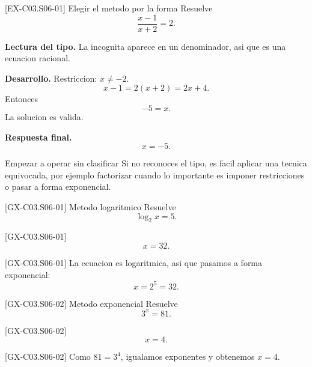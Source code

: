 \begin{solvedexample}{[EX-C03.S06-01] Elegir el metodo por la forma}
Resuelve
\[
\frac{x-1}{x+2}=2.
\]

\textbf{Lectura del tipo.} La incognita aparece en un denominador, asi que es una ecuacion
racional.

\textbf{Desarrollo.} Restriccion: \(x\neq -2\).
\[
x-1=2(x+2)=2x+4.
\]
Entonces
\[
-5=x.
\]
La solucion es valida.

\textbf{Respuesta final.}
\[
x=-5.
\]
\end{solvedexample}

\begin{commonerror}{Empezar a operar sin clasificar}
Si no reconoces el tipo, es facil aplicar una tecnica equivocada, por ejemplo factorizar cuando
lo importante es imponer restricciones o pasar a forma exponencial.
\end{commonerror}

\begin{guidedexercise}{[GX-C03.S06-01] Metodo logaritmico}
Resuelve
\[
\log_2 x=5.
\]
\end{guidedexercise}

\begin{shortanswer}{[GX-C03.S06-01]}
\[
x=32.
\]
\end{shortanswer}

\begin{fullsolution}{[GX-C03.S06-01]}
La ecuacion es logaritmica, asi que pasamos a forma exponencial:
\[
x=2^5=32.
\]
\end{fullsolution}

\begin{guidedexercise}{[GX-C03.S06-02] Metodo exponencial}
Resuelve
\[
3^x=81.
\]
\end{guidedexercise}

\begin{shortanswer}{[GX-C03.S06-02]}
\[
x=4.
\]
\end{shortanswer}

\begin{fullsolution}{[GX-C03.S06-02]}
Como \(81=3^4\), igualamos exponentes y obtenemos \(x=4\).
\end{fullsolution}

